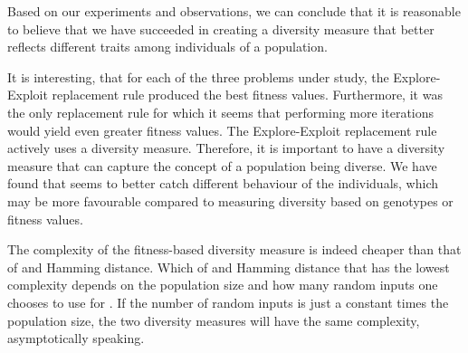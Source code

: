 Based on our experiments and observations, we can conclude that it is reasonable to believe that we have succeeded in creating a diversity measure that better reflects different traits among individuals of a population.

It is interesting, that for each of the three problems under study, the Explore-Exploit replacement rule produced the best fitness values. Furthermore, it was the only replacement rule for which it seems that performing more iterations would yield even greater fitness values. 
The Explore-Exploit replacement rule actively uses a diversity measure.
Therefore, it is important to have a diversity measure that can capture the concept of a population being diverse.
We have found that \dia{} seems to better catch different behaviour of the individuals, which may be more favourable compared to measuring diversity based on genotypes or fitness values.

The complexity of the fitness-based diversity measure is indeed cheaper than that of \dia{} and Hamming distance.
Which of \dia{} and Hamming distance that has the lowest complexity depends on the population size and how many random inputs one chooses to use for \dia{}. If the number of random inputs is just a constant times the population size, the two diversity measures will have the same complexity, asymptotically speaking.